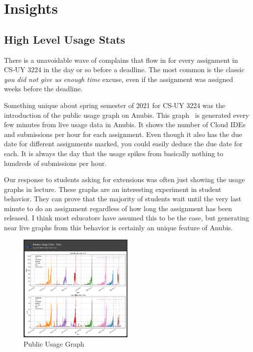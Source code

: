 \chapter{Insights}\label{ch:insights}

\section{High Level Usage Stats}\label{sec:high-level-usage-stats}

There is a unavoidable wave of complains that flow in for every assignment in CS-UY 3224
in the day or so before a deadline.
The most common is the classic \textit{you did not give us enough time} excuse,
even if the assignment was assigned weeks before the deadline.

Something unique about spring semester of 2021 for CS-UY 3224 was the introduction of the public usage graph on Anubis.
This graph~ is generated every few minutes from live usage data in Anubis.
It shows the number of Cloud IDEs and submissions per hour for each assignment.
Even though it also has the due date for different assignments marked, you could easily deduce the
due date for each.
It is always the day that the usage spikes from basically nothing to hundreds of submissions per hour.

Our response to students asking for extensions was often just showing the usage graphs in lecture.
These graphs are an interesting experiment in student behavior.
They can prove that the majority of students wait until the very last minute to do an assignment
regardless of how long the assignment has been released.
I think most educators have assumed this to be the case, but generating near live graphs from 
this behavior is certainly an unique feature of Anubis.  

\begin{figure}[ht]
    \centering
    \includegraphics[width=0.5\textwidth]{figures/public-usage-1}
    \caption{Public Usage Graph\label{fig:public-usage}}
\end{figure}

